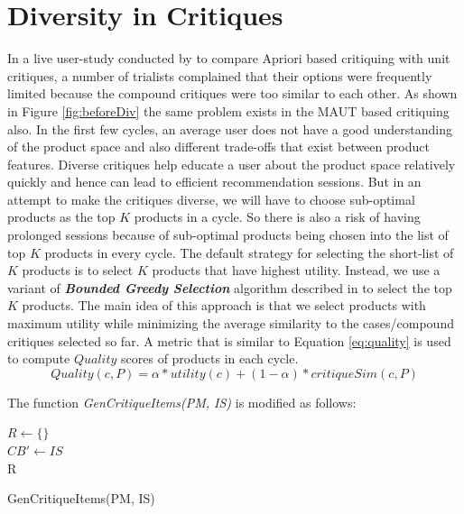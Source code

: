 \section{Diversity in Critiques}
\label{sec:div}
In a live user-study conducted by \cite{aprioriUserStudy} to compare Apriori based critiquing with unit critiques, a number of trialists complained that their options were frequently limited because the compound critiques were too similar to each other.
As shown in Figure \ref{fig:beforeDiv} the same problem exists in the MAUT based critiquing also.
In the first few cycles, an average user does not have a good understanding of the product space and also different trade-offs that exist between product features.
Diverse critiques help educate a user about the product space relatively quickly and hence can lead to efficient recommendation sessions.
But in an attempt to make the critiques diverse, we will have to choose sub-optimal products as the top $K$ products in a cycle.
So there is also a risk of having prolonged sessions because of sub-optimal products being chosen into the list of top $K$ products in every cycle.
The default strategy for selecting the short-list of $K$ products is to select $K$ products that have highest utility.
Instead, we use a variant of \textit{\textbf{Bounded Greedy Selection}} algorithm described in \cite{boundedGreedy} to select the top $K$ products.
The main idea of this approach is that we select products with maximum utility while minimizing the average similarity to the cases/compound critiques selected so far.
A metric that is similar to Equation \ref{eq:quality} is used to compute $Quality$ scores of products in each cycle.
\begin{equation}
\label{eq:quality}
Quality(c, P) = \alpha * utility(c) + (1-\alpha)*critiqueSim(c, P)
\end{equation}

The function \textit{GenCritiqueItems(PM, IS)} is modified as follows:
\begin{algorithm}[ht]
  \DontPrintSemicolon

  $R \gets \{\}$\\
  $CB' \gets IS$\\
  \Return R
  \caption{GenCritiqueItems(PM, IS)}
  \label{algo:div}
\end{algorithm}

